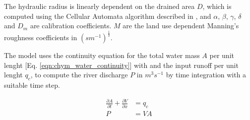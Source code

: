 \documentclass[journal abbreviation, manuscript]{copernicus}
\begin{document}
The hydraulic radius is linearly dependent on the drained area $D$, which
is computed using the Cellular Automata algorithm described in
\cite{coppola-2007}, and $\alpha$, $\beta$, $\gamma$, $\delta$ and $D_{m}$ are
calibration coefficients.
$M$ are the land use dependent Manning's roughness coefficients in
$(s m^{-1})^{\frac{1}{3}}$.



The model uses the continuity equation for the total water mass $A$ per unit
lenght [Eq. \ref{eqn:chym_water_continuity}] with and the input runoff per unit
lenght $q_c$, to compute the river discharge $P$ in $m^3 s^{-1}$ by time
integration with a suitable time step.

\begin{align}
    \label{eqn:chym_water_continuity}
    \frac{\partial A}{\partial t} + \frac{\partial V}{\partial x} &= q_c \\
    P &= V A
\end{align}

\noappendix       %




\appendixfigures  %

\appendixtables   %





\end{document}
